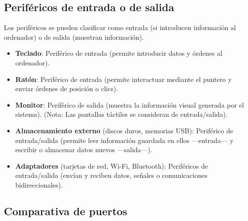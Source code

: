 \documentclass[11.5pt]{article}
\begin{document}
	\subsection{Periféricos de entrada o de salida}
	
	Los periféricos se pueden clasificar como entrada (si introducen información al ordenador) o de salida (muestran información).
	
	\begin{itemize}
		\item \textbf{Teclado}: Periférico de entrada (permite introducir datos y órdenes al ordenador).
		\item 	\textbf{Ratón}: Periférico de entrada (permite interactuar mediante el puntero y enviar órdenes de posición o clics).
		\item 	\textbf{Monitor}: Periférico de salida (muestra la información visual generada por el sistema). (Nota: Las pantallas táctiles se consideran de entrada/salida).
		\item 	\textbf{Almacenamiento externo} (discos duros, memorias USB): Periférico de entrada/salida (permite leer información guardada en ellos —entrada— y escribir o almacenar datos nuevos —salida—).
		\item 	\textbf{Adaptadores} (tarjetas de red, Wi-Fi, Bluetooth): Periféricos de entrada/salida (envían y reciben datos, señales o comunicaciones bidireccionales).
	\end{itemize}
	
	\subsection{Comparativa de puertos}
	
\end{document}
